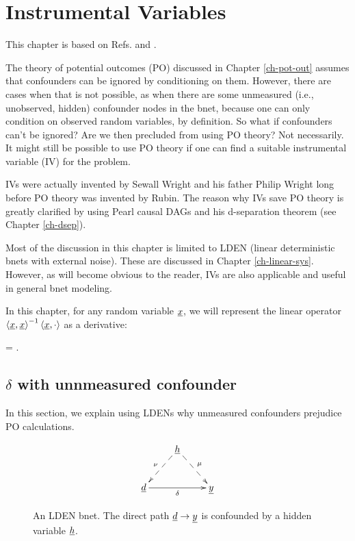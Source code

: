 \chapter{Instrumental Variables}
\label{ch-instrumental}


This chapter is based on
Refs.\cite{book-mixtape} and \cite{wiki-inst-vars}.

The theory of potential outcomes (PO)
discussed in Chapter \ref{ch-pot-out}
assumes that confounders can be ignored
by conditioning on them.
However, there are cases when
that is not possible, as when there are some
unmeasured (i.e., unobserved, hidden)
confounder nodes in the bnet,
because one can
only condition on observed random 
variables, by definition.
So what if confounders can't be ignored?
Are we then precluded from using PO theory?
Not necessarily.
It might still be possible to
use PO theory if one can find a suitable
instrumental variable (IV) for the problem.

IVs were actually invented 
by Sewall Wright and his father Philip
Wright long before
PO theory was invented  by Rubin.
The reason why IVs save PO theory
is greatly clarified by using
Pearl causal DAGs and his d-separation theorem 
(see Chapter \ref{ch-dsep}).

Most of the discussion in this chapter
is  limited to LDEN (linear deterministic
bnets with external noise). These
are discussed in Chapter \ref{ch-linear-sys}.
However, as will become
obvious to the reader, IVs are 
also applicable
and useful
in general bnet modeling.

In this
chapter, 
for any random
variable ${\underline{x}}$, we will represent 
the linear 
operator
$\left\langle{\underline{x}}, {\underline{x}}\right\rangle^{-1}\left\langle{\underline{x}}, \cdot\right\rangle
$ as a derivative:

\beq
{}=
\frac{\av{\rvx, \cdot}}
{\av{\rvx, \rvx}}
\;.
\eeq


\section{$\delta$ with unnmeasured confounder}

In this section,
we explain using LDENs 
why
unmeasured confounders 
prejudice PO calculations.

\begin{figure}[h!]
$$
\xymatrix{
&\rvh\ar@{-->}[dl]_\nu\ar@{-->}[dr]^\mu
\\
\rvd\ar[rr]_\delta&&\rvy
}$$
\caption{An LDEN bnet. The direct path ${\underline{d}}\rightarrow{\underline{y}}$
is confounded by
a hidden variable ${\underline{h}}$.
} 
\label{fig-iv-G-start}
\end{figure}

